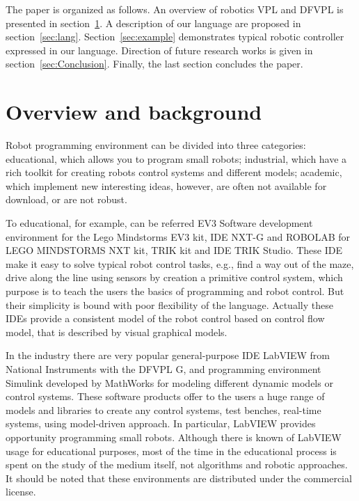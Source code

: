 \documentclass[conference,compsoc]{IEEEtran}
\begin{document}
The paper is organized as follows. An overview of robotics VPL and DFVPL is presented in section~\ref{sec:Overview}. A description of our language are proposed in section~\ref{sec:lang}. Section~\ref{sec:example} demonstrates typical robotic controller expressed in our language. Direction of future research works is given in section~\ref{sec:Conclusion}. Finally, the last section concludes the paper.


\section{Overview and background}
\label{sec:Overview}
Robot programming environment can be divided into three categories: educational, which allows you to program small robots; industrial, which have a rich toolkit for creating robots control systems and different models; academic, which implement new interesting ideas, however, are often not available for download, or are not robust.

To educational, for example, can be referred EV3 Software development environment for the Lego Mindstorms EV3 kit, IDE NXT-G and ROBOLAB for LEGO MINDSTORMS NXT kit, TRIK kit and IDE TRIK Studio. These IDE make it easy to solve typical robot control tasks, e.g., find a way out of the maze, drive along the line using sensors by creation a primitive control system, which purpose is to teach the users the basics of programming and robot control. But their simplicity is bound with poor flexibility of the language. Actually these IDEs provide a consistent model of the robot control based on control flow model, that is described by visual graphical models.

In the industry there are very popular general-purpose IDE LabVIEW from National Instruments with the DFVPL G, and programming environment Simulink developed by MathWorks for modeling different dynamic models or control systems. These software products offer to the users a huge range of models and libraries to create any control systems, test benches, real-time systems, using model-driven approach. In particular, LabVIEW provides opportunity programming small robots. Although there is known of LabVIEW usage for educational purposes\cite{1_gomez-de-gabriel_mandow_fernandez-lozano_garcia-cerezo_2011}, most of the time in the educational process is spent on the study of the medium itself, not algorithms and robotic approaches. It should be noted that these environments are distributed under the commercial license.
\end{document}
